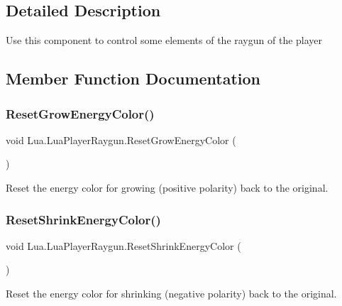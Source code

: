 \subsection{Detailed Description}
Use this component to control some elements of the raygun of the player 



\subsection{Member Function Documentation}
\mbox{\label{class_lua_1_1_lua_player_raygun_aa7b98cc0da08ae879220e9729a47659e}} 
\subsubsection{\texorpdfstring{ResetGrowEnergyColor()}{ResetGrowEnergyColor()}}
{\footnotesize\ttfamily void Lua.\+Lua\+Player\+Raygun.\+Reset\+Grow\+Energy\+Color (\begin{DoxyParamCaption}{ }\end{DoxyParamCaption})}



Reset the energy color for growing (positive polarity) back to the original. 

\mbox{\label{class_lua_1_1_lua_player_raygun_a80852badcc3f3b0c14e73196b5299c37}} 
\subsubsection{\texorpdfstring{ResetShrinkEnergyColor()}{ResetShrinkEnergyColor()}}
{\footnotesize\ttfamily void Lua.\+Lua\+Player\+Raygun.\+Reset\+Shrink\+Energy\+Color (\begin{DoxyParamCaption}{ }\end{DoxyParamCaption})}



Reset the energy color for shrinking (negative polarity) back to the original. 

\mbox{\label{class_lua_1_1_lua_player_raygun_a6787608c1207618d069fba8aee7c8fff}} 
